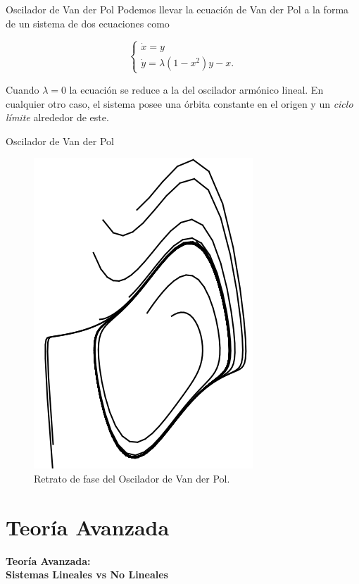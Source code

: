 \documentclass{beamer}
\newcommand{\stframe}[1]{\begin{frame} \begin{center}\Large{\textbf{{#1}}}\end{center}\end{frame}}
\begin{document}
\begin{frame}{Oscilador de Van der Pol}
Podemos llevar la ecuación de Van der Pol a la forma de un sistema de dos ecuaciones como

$$
\left\{	\begin{array}{l}
		\dot{x} = y \\
		\dot{y} = \lambda (1-x^2)y - x.
	\end{array}	 \right.
$$

Cuando $\lambda = 0$ la ecuación se reduce a la del oscilador armónico lineal. En cualquier otro caso, el sistema posee una órbita constante en el origen y un \emph{ciclo límite} alrededor de este.
\end{frame}

\begin{frame}{Oscilador de Van der Pol}
\begin{figure}[!ht] \centering
	\includegraphics[scale=0.35]{../figures/vanderpol.png}
	\caption{Retrato de fase del Oscilador de Van der Pol.}
\end{figure}
\end{frame}

\section{Teoría Avanzada}
\stframe{Teoría Avanzada:\\Sistemas Lineales vs No Lineales}
\end{document}
